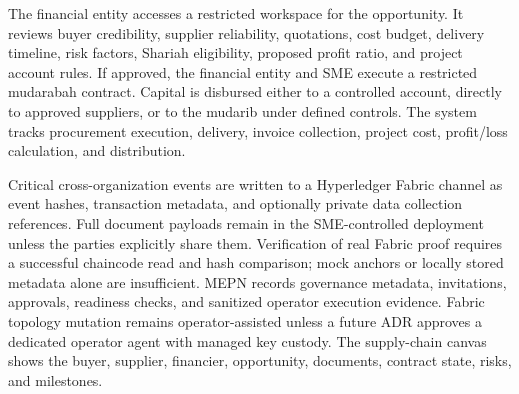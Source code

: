 \documentclass[11pt,a4paper]{article}
\begin{document}
The financial entity accesses a restricted workspace for the opportunity. It reviews buyer credibility, supplier reliability, quotations, cost budget, delivery timeline, risk factors, Shariah eligibility, proposed profit ratio, and project account rules. If approved, the financial entity and SME execute a restricted mudarabah contract. Capital is disbursed either to a controlled account, directly to approved suppliers, or to the mudarib under defined controls. The system tracks procurement execution, delivery, invoice collection, project cost, profit/loss calculation, and distribution.

Critical cross-organization events are written to a Hyperledger Fabric channel as event hashes, transaction metadata, and optionally private data collection references. Full document payloads remain in the SME-controlled deployment unless the parties explicitly share them. Verification of real Fabric proof requires a successful chaincode read and hash comparison; mock anchors or locally stored metadata alone are insufficient. MEPN records governance metadata, invitations, approvals, readiness checks, and sanitized operator execution evidence. Fabric topology mutation remains operator-assisted unless a future ADR approves a dedicated operator agent with managed key custody. The supply-chain canvas shows the buyer, supplier, financier, opportunity, documents, contract state, risks, and milestones.
\end{document}

